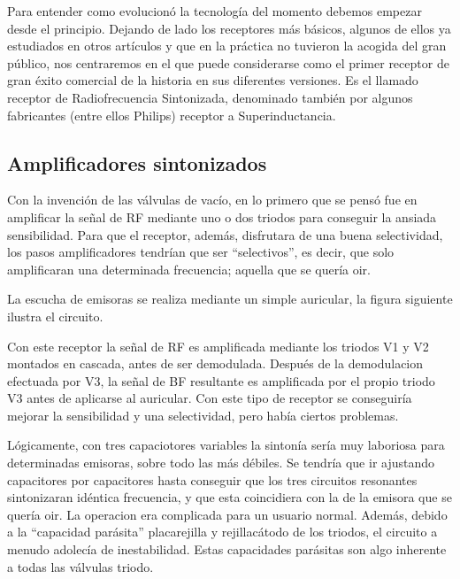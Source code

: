 \documentclass[letterpaper,11pt,spanish]{sphinxmanual}
\let\sphinxpxdimen\pdfpxdimen\else\newdimen\sphinxpxdimen
\begin{document}
Para entender como evolucionó la tecnología del momento debemos empezar desde el principio. Dejando de lado los receptores más básicos, algunos de ellos ya estudiados en otros artículos y que en la práctica no tuvieron la acogida del gran público, nos centraremos en el que puede considerarse como el primer receptor de gran éxito comercial de la historia en sus diferentes versiones. Es el llamado receptor de Radiofrecuencia Sintonizada, denominado también por algunos fabricantes (entre ellos
Philips) receptor a Superinductancia.


\subsection{Amplificadores sintonizados}
\label{\detokenize{introduccion/sistemas:Amplificadores-sintonizados}}
Con la invención de las válvulas de vacío, en lo primero que se pensó fue en amplificar la señal de RF mediante uno o dos triodos para conseguir la ansiada sensibilidad. Para que el receptor, además, disfrutara de una buena selectividad, los pasos amplificadores tendrían que ser “selectivos”, es decir, que solo amplificaran una determinada frecuencia; aquella que se quería oir.

La escucha de emisoras se realiza mediante un simple auricular, la figura siguiente ilustra el circuito.

\sphinxincludegraphics[width=588\sphinxpxdimen,height=210\sphinxpxdimen]{{receprfs1low}.png}

Con este receptor la señal de RF es amplificada mediante los triodos V1 y V2 montados en cascada, antes de ser demodulada. Después de la demodulacion efectuada por V3, la señal de BF resultante es amplificada por el propio triodo V3 antes de aplicarse al auricular. Con este tipo de receptor se conseguiría mejorar la sensibilidad y una selectividad, pero había ciertos problemas.

Lógicamente, con tres capaciotores variables la sintonía sería muy laboriosa para determinadas emisoras, sobre todo las más débiles. Se tendría que ir ajustando capacitores por capacitores hasta conseguir que los tres circuitos resonantes sintonizaran idéntica frecuencia, y que esta coincidiera con la de la emisora que se quería oir. La operacion era complicada para un usuario normal. Además, debido a la “capacidad parásita” placa\sphinxhyphen{}rejilla y rejilla\sphinxhyphen{}cátodo de los triodos, el circuito a menudo
adolecía de inestabilidad. Estas capacidades parásitas son algo inherente a todas las válvulas triodo.
\end{document}

